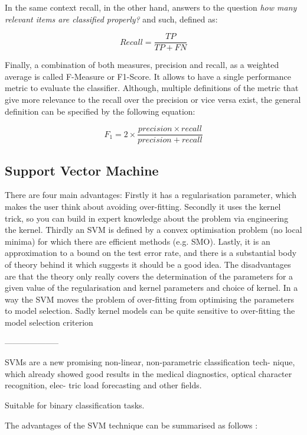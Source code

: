 In the same context recall, in the other hand, answers to the question \textit{how many relevant items are classified properly?} and such, defined as:

\[Recall=\frac{TP}{TP+FN}\]

Finally, a combination of both measures, precision and recall, as a weighted average is called F-Measure or F1-Score. It allows to have a single performance metric to evaluate the classifier. Although, multiple definitions of the metric that give more relevance to the recall over the precision or vice versa exist, the general definition can be specified by the following equation:

\[F_1=2 \times \frac{precision \times recall}{precision+recall}\]

\iffalse

\subsection{Support Vector Machine}

There are four main advantages: Firstly it has a regularisation parameter, which makes the user think about avoiding over-fitting. Secondly it uses the kernel trick, so you can build in expert knowledge about the problem via engineering the kernel. Thirdly an SVM is defined by a convex optimisation problem (no local minima) for which there are efficient methods (e.g. SMO). Lastly, it is an approximation to a bound on the test error rate, and there is a substantial body of theory behind it which suggests it should be a good idea.
The disadvantages are that the theory only really covers the determination of the parameters for a given value of the regularisation and kernel parameters and choice of kernel. In a way the SVM moves the problem of over-fitting from optimising the parameters to model selection. Sadly kernel models can be quite sensitive to over-fitting the model selection criterion \cite{cawley2010over}

--------------------

SVMs are a new promising non-linear, non-parametric classification tech- nique, which already showed good results in the medical diagnostics, optical character recognition, elec- tric load forecasting and other fields.

Suitable for binary classification tasks.

The advantages of the SVM technique can be summarised as follows \cite{auria2008support}:

